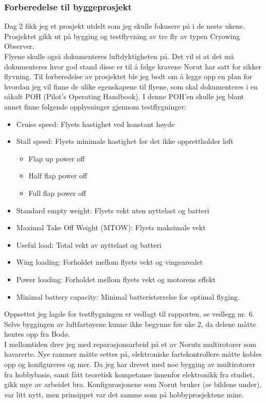 \documentclass[12pt, a4paper]{article}
\begin{document}
\subsubsection{Forberedelse til byggeprosjekt}
Dag 2 fikk jeg et prosjekt utdelt som jeg skulle fokusere på i de neste ukene. Prosjektet gikk ut på bygging og testflyvning av tre fly av typen Cryowing Observer. \\
Flyene skulle også dokumenteres luftdyktigheten på. Det vil si at det må dokumenteres hvor god stand disse er til å følge kravene Norut har satt for sikker flyvning. Til forberedelse av prosjektet ble jeg bedt om å legge opp en plan for hvordan jeg vil finne de ulike egenskapene til flyene, som skal dokumenteres i en såkalt POH (Pilot's Operating Handbook). I denne POH'en skulle jeg blant annet finne følgende opplysninger gjennom testflygninger: 
\begin{itemize}
	\item Cruise speed: Flyets hastighet ved konstant høyde
	\item Stall speed: Flyets minimale hastighet før det ikke opprettholder løft
	\begin{itemize}
		\item Flap up power off
		\item Half flap power off
		\item Full flap power off	
	\end{itemize}
	\item Standard empty weight: Flyets vekt uten nyttelast og batteri
	\item Maximal Take Off Weight (MTOW): Flyets maksimale vekt
	\item Useful load: Total vekt av nyttelast og batteri
	\item Wing loading: Forholdet mellom flyets vekt og vingearealet
	\item Power loading: Forholdet mellom flyets vekt og motorens effekt
	\item Minimal battery capacity: Minimal batteristørrelse for optimal flyging. 
\end{itemize}
Oppsettet jeg lagde for testflygningen er vedlagt til rapporten, se vedlegg nr. 6. 
Selve byggingen av luftfartøyene kunne ikke begynne før uke 2, da delene måtte hentes opp fra Bodø. \\ 
\newpage
I mellomtiden drev jeg med reparasjonsarbeid på et av Noruts multirotorer som havarerte. Nye rammer måtte settes på, elektroniske fartskontrollere måtte kobles opp og konfigureres og mer. Da jeg har drevet med noe bygging av multirotorer fra hobbybasis, samt fått teoretisk kompetanse innenfor elektronikk fra studiet, gikk mye av arbeidet bra. Konfigurasjonene som Norut bruker (se bildene under), var litt nytt, men prinsippet var det samme som på hobbyprosjektene mine. \\
\end{document}
